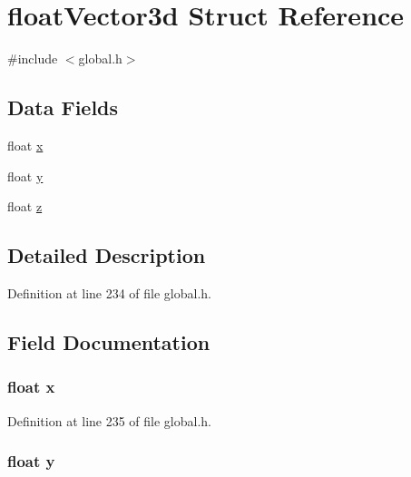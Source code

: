 \hypertarget{structfloatVector3d}{\section{float\-Vector3d Struct Reference}
\label{structfloatVector3d}
}


{\ttfamily \#include $<$global.\-h$>$}

\subsection*{Data Fields}
\begin{DoxyCompactItemize}
\item 
float \hyperlink{structfloatVector3d_ad0da36b2558901e21e7a30f6c227a45e}{x}
\item 
float \hyperlink{structfloatVector3d_aa4f0d3eebc3c443f9be81bf48561a217}{y}
\item 
float \hyperlink{structfloatVector3d_af73583b1e980b0aa03f9884812e9fd4d}{z}
\end{DoxyCompactItemize}


\subsection{Detailed Description}


Definition at line 234 of file global.\-h.



\subsection{Field Documentation}
\hypertarget{structfloatVector3d_ad0da36b2558901e21e7a30f6c227a45e}{
\subsubsection[{x}]{\setlength{\rightskip}{0pt plus 5cm}float x}}\label{structfloatVector3d_ad0da36b2558901e21e7a30f6c227a45e}


Definition at line 235 of file global.\-h.

\hypertarget{structfloatVector3d_aa4f0d3eebc3c443f9be81bf48561a217}{
\subsubsection[{y}]{\setlength{\rightskip}{0pt plus 5cm}float y}}\label{structfloatVector3d_aa4f0d3eebc3c443f9be81bf48561a217}


